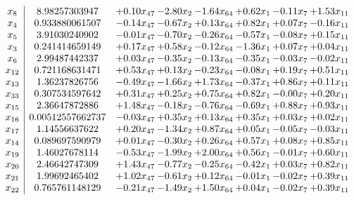 \documentclass[8pt]{article}
\begin{document}
\[\begin{array}{c| c c@{\hskip 2pt} c@{\hskip 2pt} c@{\hskip 2pt} c@{\hskip 2pt} c@{\hskip 2pt} c@{\hskip 2pt} }
 x_{8}   &  8.98257303947 & +  0.10 x_{47} & -2.80 x_{2} & -1.64 x_{64} & +  0.62 x_{1} & -0.11 x_{7} & +  1.53 x_{11}\\
 x_{4}   &  0.933880061507 & -0.14 x_{47} & -0.67 x_{2} & +  0.13 x_{64} & +  0.82 x_{1} & +  0.07 x_{7} & -0.16 x_{11}\\
 x_{5}   &  3.91030240902 & -0.01 x_{47} & -0.70 x_{2} & -0.26 x_{64} & -0.57 x_{1} & -0.08 x_{7} & +  0.15 x_{11}\\
 x_{3}   &  0.241414659149 & +  0.17 x_{47} & +  0.58 x_{2} & -0.12 x_{64} & -1.36 x_{1} & +  0.07 x_{7} & +  0.04 x_{11}\\
 x_{6}   &  2.99487442337 & +  0.03 x_{47} & -0.35 x_{2} & -0.13 x_{64} & -0.35 x_{1} & -0.03 x_{7} & -0.02 x_{11}\\
 x_{12}   &  0.721168631471 & +  0.53 x_{47} & +  0.13 x_{2} & -0.23 x_{64} & -0.08 x_{1} & +  0.19 x_{7} & +  0.51 x_{11}\\
 x_{13}   &  1.36237826756 & -0.49 x_{47} & -1.66 x_{2} & +  1.73 x_{64} & -0.37 x_{1} & +  0.86 x_{7} & +  0.11 x_{11}\\
 x_{33}   &  0.307534597642 & +  0.31 x_{47} & +  0.25 x_{2} & +  0.75 x_{64} & +  0.82 x_{1} & -0.00 x_{7} & +  0.20 x_{11}\\
 x_{15}   &  2.36647872886 & +  1.48 x_{47} & -0.18 x_{2} & -0.76 x_{64} & -0.69 x_{1} & +  0.88 x_{7} & +  0.93 x_{11}\\
 x_{16}   &  0.00512557662737 & -0.03 x_{47} & +  0.35 x_{2} & +  0.13 x_{64} & +  0.35 x_{1} & +  0.03 x_{7} & +  0.02 x_{11}\\
 x_{17}   &  1.14556637622 & +  0.20 x_{47} & -1.34 x_{2} & +  0.87 x_{64} & +  0.05 x_{1} & -0.05 x_{7} & -0.03 x_{11}\\
 x_{14}   &  0.089697590979 & +  0.01 x_{47} & -0.30 x_{2} & +  0.26 x_{64} & +  0.57 x_{1} & +  0.08 x_{7} & +  0.85 x_{11}\\
 x_{19}   &  1.46027678114 & -0.53 x_{47} & -1.99 x_{2} & +  2.00 x_{64} & +  0.56 x_{1} & -0.01 x_{7} & +  0.60 x_{11}\\
 x_{20}   &  2.46642747309 & +  1.43 x_{47} & -0.77 x_{2} & -0.25 x_{64} & -0.42 x_{1} & +  0.03 x_{7} & +  0.82 x_{11}\\
 x_{21}   &  1.99692465402 & +  1.02 x_{47} & -0.61 x_{2} & +  0.12 x_{64} & -0.01 x_{1} & -0.02 x_{7} & +  0.39 x_{11}\\
 x_{22}   &  0.765761148129 & -0.21 x_{47} & -1.49 x_{2} & +  1.50 x_{64} & +  0.04 x_{1} & -0.02 x_{7} & +  0.39 x_{11}\\

\end{array}\]
\end{document}
